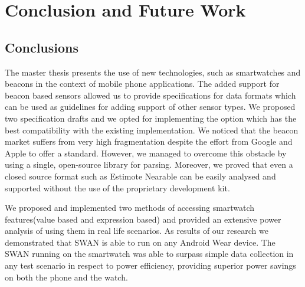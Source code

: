 
\chapter{Conclusion and Future Work} %

\label{Chapter7} %



\section{Conclusions}
The master thesis presents the use of new technologies, such as smartwatches and beacons in the context of mobile phone applications. 
The added support for beacon based sensors allowed us to provide specifications for data formats which can be used as guidelines for adding support of other sensor types. We proposed two
specification drafts and we opted for implementing the option which has the best compatibility with the existing implementation.
We noticed that the beacon market suffers from very high fragmentation despite the effort from Google and Apple to offer a standard. However, we managed to overcome this obstacle by using
a single, open-source library for parsing. Moreover, we proved that even a closed source format such as Estimote Nearable can be easily analysed and supported without the use of the proprietary development kit.

We proposed and implemented two methods 
of accessing smartwatch features(value based and expression based) and provided an extensive power analysis of using them in real life scenarios. As results of our research we demonstrated that SWAN is able to run
on any Android Wear device. The SWAN running on the smartwatch was able to surpass simple data collection in any test scenario in respect to power efficiency,
providing superior power savings on both the phone and the watch.



